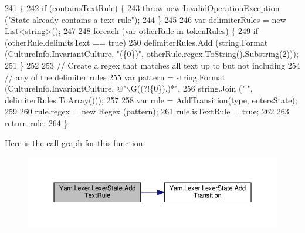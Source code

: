 \begin{DoxyCode}
241             \{
242                 \textcolor{keywordflow}{if} (\hyperlink{a00130_a69948f05c35eeae9cb8448c849a053e6}{containsTextRule}) \{
243                     \textcolor{keywordflow}{throw} \textcolor{keyword}{new} InvalidOperationException (\textcolor{stringliteral}{"State already contains a text rule"});
244                 \}
245 
246                 var delimiterRules = \textcolor{keyword}{new} List<string>();
247 
248                 \textcolor{keywordflow}{foreach} (var otherRule \textcolor{keywordflow}{in} \hyperlink{a00130_adf6563b1dc6f3ef80ed13c2b15b7be03}{tokenRules}) \{
249                     \textcolor{keywordflow}{if} (otherRule.delimitsText == \textcolor{keyword}{true})
250                         delimiterRules.Add (string.Format (CultureInfo.InvariantCulture, \textcolor{stringliteral}{"(\{0\})"}, 
      otherRule.regex.ToString().Substring(2)));
251                 \}
252 
253                 \textcolor{comment}{// Create a regex that matches all text up to but not including}
254                 \textcolor{comment}{// any of the delimiter rules}
255                 var pattern = string.Format (CultureInfo.InvariantCulture, \textcolor{stringliteral}{@"\(\backslash\)G((?!\{0\}).)*"},
256                     string.Join (\textcolor{stringliteral}{"|"}, delimiterRules.ToArray()));
257 
258                 var rule = \hyperlink{a00130_a71ba52744e853ff142de19e97cf5daed}{AddTransition}(type, entersState);
259 
260                 rule.regex = \textcolor{keyword}{new} Regex (pattern);
261                 rule.isTextRule = \textcolor{keyword}{true};
262 
263                 \textcolor{keywordflow}{return} rule;
264             \}
\end{DoxyCode}


Here is the call graph for this function\-:
\nopagebreak
\begin{figure}[H]
\begin{center}
\leavevmode
\includegraphics[width=350pt]{a00130_af183111863c651ae5681665a2c379830_cgraph}
\end{center}
\end{figure}


